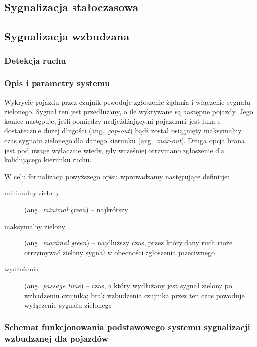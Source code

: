 \documentclass{pracamgr}
\newcommand{\ang}[1]{(ang.~\emph{#1})}
\begin{document}
\subsection{Sygnalizacja stałoczasowa}
\subsection{Sygnalizacja wzbudzana}

\subsubsection{Detekcja ruchu}
\label{ss:detekcja}

\subsubsection{Opis i parametry systemu}
\label{sec:opis-parametry}
Wykrycie pojazdu przez czujnik powoduje zgłoszenie żądania i włączenie
sygnału zielonego. Sygnał ten jest przedłużany, o ile wykrywane są
następne pojazdy. Jego koniec następuje, jeśli pomiędzy
nadjeżdżającymi pojazdami jest luka o dostatecznie dużej długości
\ang{\mbox{gap-out}} bądź został osiągnięty maksymalny czas sygnału
zielonego dla danego kierunku \ang{\mbox{max-out}}. Druga opcja brana
jest pod uwagę wyłącznie wtedy, gdy wcześniej otrzymano zgłoszenie dla
kolidującego kierunku ruchu.

W celu formalizacji powyższego opisu wprowadzamy następujące definicje:%
\begin{description}
  \item[minimalny zielony] \ang{minimal green} -- najkrótszy
  \item[maksymalny zielony] \ang{maximal green} -- najdłuższy czas,
  przez który dany ruch może otrzymywać zielony sygnał w obecności
  zgłoszenia przeciwnego
  \item[wydłużenie] \ang{passage time} -- czas, o który wydłużany jest
  sygnał zielony po wzbudzeniu czujnika; brak wzbudzenia czujnika
  przez ten czas powoduje wyłączenie sygnału zielonego
\end{description}

\subsubsection{Schemat funkcjonowania podstawowego systemu sygnalizacji wzbudzanej dla pojazdów}
\label{ss:wzbudzana-schemat}
\end{document}
